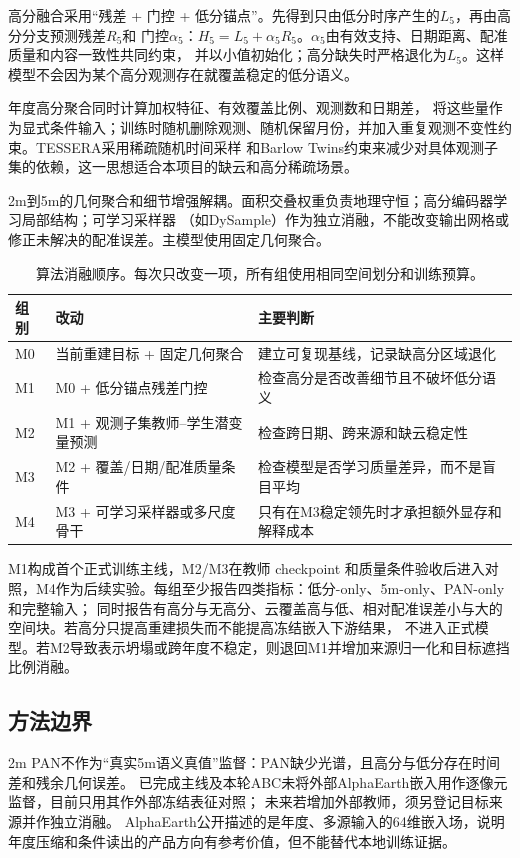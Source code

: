 \documentclass[UTF8,fontset=fandol,zihao=5,a4paper]{ctexart}
\begin{document}
高分融合采用“残差 + 门控 + 低分锚点”。先得到只由低分时序产生的$L_5$，再由高分分支预测残差$R_5$和
门控$\alpha_5$：$H_5=L_5+\alpha_5R_5$。$\alpha_5$由有效支持、日期距离、配准质量和内容一致性共同约束，
并以小值初始化；高分缺失时严格退化为$L_5$。这样模型不会因为某个高分观测存在就覆盖稳定的低分语义。

年度高分聚合同时计算加权特征、有效覆盖比例、观测数和日期差，
将这些量作为显式条件输入；训练时随机删除观测、随机保留月份，并加入重复观测不变性约束。TESSERA采用稀疏随机时间采样
和Barlow Twins约束来减少对具体观测子集的依赖，这一思想适合本项目的缺云和高分稀疏场景\cite{tessera,barlow}。

2m到5m的几何聚合和细节增强解耦。面积交叠权重负责地理守恒；高分编码器学习局部结构；可学习采样器
（如DySample）作为独立消融，不能改变输出网格或修正未解决的配准误差\cite{dysample}。主模型使用固定几何聚合。

\begin{table}[h]
\caption{算法消融顺序。每次只改变一项，所有组使用相同空间划分和训练预算。}
\centering\small
\begin{tabularx}{\linewidth}{@{}p{1.2cm}p{4cm}Y@{}}
\toprule 组别 & 改动 & 主要判断\\\midrule
M0 & 当前重建目标 + 固定几何聚合 & 建立可复现基线，记录缺高分区域退化\\
M1 & M0 + 低分锚点残差门控 & 检查高分是否改善细节且不破坏低分语义\\
M2 & M1 + 观测子集教师--学生潜变量预测 & 检查跨日期、跨来源和缺云稳定性\\
M3 & M2 + 覆盖/日期/配准质量条件 & 检查模型是否学习质量差异，而不是盲目平均\\
M4 & M3 + 可学习采样器或多尺度骨干 & 只有在M3稳定领先时才承担额外显存和解释成本\\\bottomrule
\end{tabularx}
\end{table}

M1构成首个正式训练主线，M2/M3在教师 checkpoint 和质量条件验收后进入对照，M4作为后续实验。每组至少报告四类指标：低分-only、5m-only、PAN-only和完整输入；
同时报告有高分与无高分、云覆盖高与低、相对配准误差小与大的空间块。若高分只提高重建损失而不能提高冻结嵌入下游结果，
不进入正式模型。若M2导致表示坍塌或跨年度不稳定，则退回M1并增加来源归一化和目标遮挡比例消融。

\subsection{方法边界}
2m PAN不作为“真实5m语义真值”监督：PAN缺少光谱，且高分与低分存在时间差和残余几何误差。
已完成主线及本轮ABC未将外部AlphaEarth嵌入用作逐像元监督，目前只用其作外部冻结表征对照；
未来若增加外部教师，须另登记目标来源并作独立消融。
AlphaEarth公开描述的是年度、多源输入的64维嵌入场，说明年度压缩和条件读出的产品方向有参考价值，但不能替代本地训练证据\cite{alphaearth}。
\end{document}
